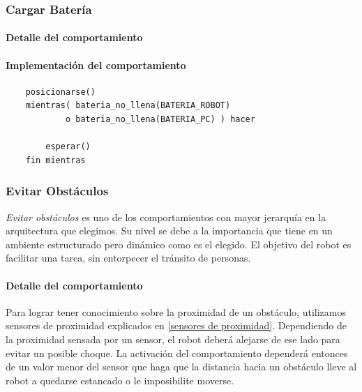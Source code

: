 \subsubsection{Cargar Bater\'ia}
\label{recharge_battery}
\paragraph{Detalle del comportamiento}
\paragraph{Implementaci\'on del comportamiento}
\begin{verbatim}
    posicionarse()
    mientras( bateria_no_llena(BATERIA_ROBOT)
            o bateria_no_llena(BATERIA_PC) ) hacer

        esperar()
    fin mientras
\end{verbatim}

\subsubsection{Evitar Obst\'aculos}
\label{avoid_obstacles}
\emph{Evitar obst\'aculos} es uno de los comportamientos con mayor jerarqu\'ia
en la arquitectura que elegimos. Su nivel se debe a la importancia que tiene
en un ambiente estructurado pero din\'amico como es el elegido. El objetivo
del robot es facilitar una tarea, sin entorpecer el tr\'ansito de personas.
\\
\paragraph{Detalle del comportamiento}
Para lograr tener conocimiento sobre la proximidad de un obst\'aculo, utilizamos
sensores de proximidad explicados en \ref{sensores de proximidad}.
Dependiendo de la proximidad sensada por un sensor, el robot deber\'a alejarse
de ese lado para evitar un posible choque. La activaci\'on del comportamiento
depender\'a entonces de un valor menor del sensor que haga que la distancia hacia
un obst\'aculo lleve al robot a quedarse estancado o le imposibilite moverse.
